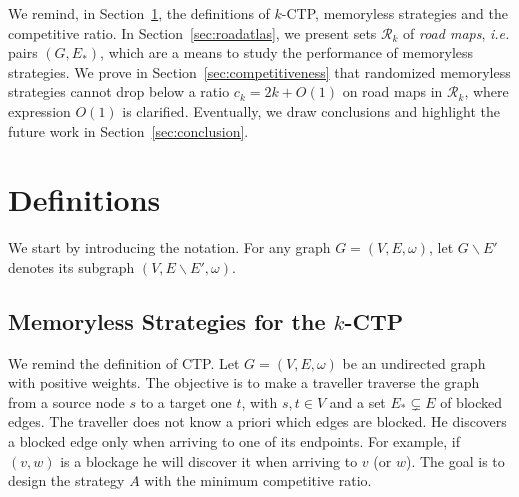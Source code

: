 \documentclass[preprint]{elsarticle}
\newcommand{\kctp}{$k$-CTP}
\newcommand{\stpath}{$(s,t)$-path}
\begin{document}
We remind, in Section~\ref{sec:def}, the definitions of \kctp , memoryless strategies and the competitive ratio.
In Section~\ref{sec:roadatlas}, we present sets $\mathcal{R}_k$ of \textit{road maps}, {\em i.e.} pairs $\left(G,E_*\right)$, which are a means to study the performance of memoryless strategies.
We prove in Section~\ref{sec:competitiveness} that randomized memoryless strategies cannot drop below a ratio $c_k = 2k+O\left(1\right)$ on road maps in $\mathcal{R}_k$, where expression $O\left(1\right)$ is clarified.
Eventually, we draw conclusions and highlight the future work in Section~\ref{sec:conclusion}.
\section{Definitions} \label{sec:def}

We start by introducing the notation. For any graph $G=\left(V,E,\omega\right)$, let $G\backslash E'$ denotes its subgraph $\left(V,E\backslash E',\omega\right)$. 

\subsection{Memoryless Strategies for the \kctp} \label{subsec:msintro}

We remind the definition of CTP. Let $G=\left(V,E,\omega\right)$ be an undirected graph with positive weights. The objective is to make a traveller traverse the graph from a source node $s$ to a target one $t$, with $s,t \in V$ and a set $E_* \subsetneq E$ of blocked edges. %
The traveller does not know a priori which edges are blocked. He discovers a blocked edge only when arriving to one of its endpoints. For example, if $\left(v,w\right)$ is a blockage he will discover it when arriving to $v$ (or $w$). The goal is to design the strategy $A$ with the minimum competitive ratio.
\end{document}
